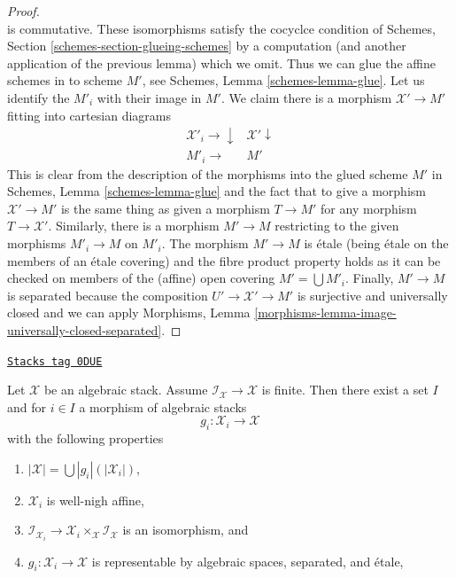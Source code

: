 \begin{proof}
$$$$
is commutative. These isomorphisms satisfy the cocyclce condition of
Schemes, Section \ref{schemes-section-glueing-schemes} by a computation
(and another application of the previous lemma) which we omit.
Thus we can glue the affine schemes in to scheme $M'$, see
Schemes, Lemma \ref{schemes-lemma-glue}.
Let us identify the $M'_i$ with their image in $M'$.
We claim there is a morphism $\mathcal{X}' \to M'$ fitting into
cartesian diagrams
$$
\begin{array}{cc}\mathcal{X}'_i \longrightarrow\downarrow & \mathcal{X}' \downarrow \\ M'_i \longrightarrow & M'\end{array}
$$
This is clear from the description of the morphisms into the glued scheme $M'$
in Schemes, Lemma \ref{schemes-lemma-glue} and the fact that to give a morphism
$\mathcal{X}' \to M'$ is the same thing as given a morphism $T \to M'$
for any morphism $T \to \mathcal{X}'$.
Similarly, there is a morphism $M' \to M$ restricting to the
given morphisms $M'_i \to M$ on $M'_i$.
The morphism $M' \to M$ is \'etale (being \'etale on the members of an
\'etale covering) and the fibre product property holds as it can
be checked on members of the (affine) open covering $M' = \bigcup M'_i$.
Finally, $M' \to M$ is separated because the composition
$U' \to \mathcal{X}' \to M'$ is surjective and universally closed
and we can apply Morphisms, Lemma
\ref{morphisms-lemma-image-universally-closed-separated}.
\end{proof}

\begin{lemma}
\label{stacks-more-morphisms-lemma-etale-local-finite-inertia}
\href{https://stacks.math.columbia.edu/tag/0DUE}{\texttt{Stacks tag 0DUE}}

Let $\mathcal{X}$ be an algebraic stack. Assume
$\mathcal{I}_\mathcal{X} \to \mathcal{X}$ is finite.
Then there exist a set $I$ and for $i \in I$ a morphism of algebraic stacks
$$
g_i : \mathcal{X}_i \longrightarrow \mathcal{X}
$$
with the following properties
\begin{enumerate}
\item $|\mathcal{X}| = \bigcup |g_i|(|\mathcal{X}_i|)$,
\item $\mathcal{X}_i$ is well-nigh affine,
\item $\mathcal{I}_{\mathcal{X}_i} \to
\mathcal{X}_i \times_\mathcal{X} \mathcal{I}_\mathcal{X}$
is an isomorphism, and
\item $g_i : \mathcal{X}_i \to \mathcal{X}$ is representable
by algebraic spaces, separated, and \'etale,
\end{enumerate}
\end{lemma}

